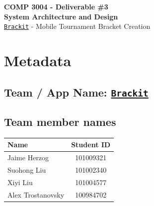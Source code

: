 \documentclass{article}
\begin{document}
\begin{center}


    \LARGE{\textbf{COMP 3004 - Deliverable \#3 \\ System Architecture and Design}}\\ 
    \Large{\href{https://github.com/alextrosta/brackit}{\texttt{Brackit}} - Mobile Tournament Bracket Creation} 
\end{center}


\section*{Metadata}
\subsection*{Team / App Name: \href{https://github.com/alextrosta/brackit}{\texttt{Brackit}}}


\subsection*{Team member names}
\begin{center}
    \begin{tabular}{ |l|c| }
        \hline
        \textbf{Name}     & \textbf{Student ID} \\
        \hline
        Jaime Herzog      & 101009321           \\
        Suohong Liu       & 101002340           \\
        Xiyi Liu          & 101004577           \\
        Alex Trostanovsky & 100984702           \\
        \hline
    \end{tabular}
\end{center}
\tableofcontents
\clearpage
\end{document}
